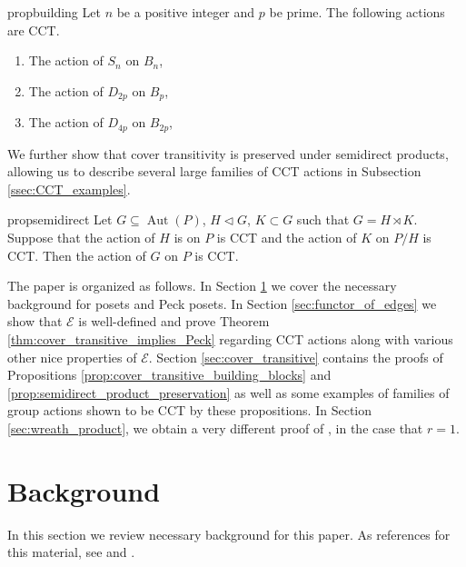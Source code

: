 \documentclass[smallextended, envcountsame, numbook]{svjour3}
\theoremstyle{plain}
\theoremstyle{definition}
\theoremstyle{remark}
\numberwithin{equation}{section}
\newcommand\Aut{\operatorname{Aut}}
\begin{document}
\begin{restatable}{prop}{building}
\label{prop:cover_transitive_building_blocks}
 Let $n$ be a positive integer and $p$ be prime.  The following actions are CCT.
\begin{enumerate}
\item The action of $S_n$ on $B_n$,
\item The action of $D_{2p}$ on $B_p$,
\item The action of $D_{4p}$ on $B_{2p}$,
\end{enumerate} 
\end{restatable}

We further show that cover transitivity is preserved under semidirect products, allowing us to describe several large families of CCT actions in Subsection \ref{ssec:CCT_examples}.

\begin{restatable}{prop}{semidirect}
\label{prop:semidirect_product_preservation}
Let $G\subseteq \Aut(P)$, $H\triangleleft G$, $K\subset G$ such that $G = H\rtimes K$.  Suppose that the action of $H$ is on $P$ is CCT and the action of $K$ on $P/H$ is CCT. Then the action of $G$ on $P$ is CCT.
\end{restatable}

The paper is organized as follows. In Section \ref{sec:background} we cover the necessary background for posets and Peck posets.  In Section \ref{sec:functor_of_edges} we show that $\mathcal E$ is well-defined and prove Theorem \ref{thm:cover_transitive_implies_Peck} regarding CCT actions along with various other nice properties of $\mathcal E$. Section \ref{sec:cover_transitive} contains the proofs of Propositions \ref{prop:cover_transitive_building_blocks} and \ref{prop:semidirect_product_preservation} as well as some examples of families of group actions shown to be CCT by these propositions. In Section \ref{sec:wreath_product}, we obtain a very different proof of \cite[Theorem 1.1]{pak}, in the case that $r = 1$.








\section{Background}\label{sec:background}

In this section we review necessary background for this paper.
As references for this material, see
\cite[Chapter 4]{stanley_alg_comb} and \cite{quotients_stanley}.
\end{document}
